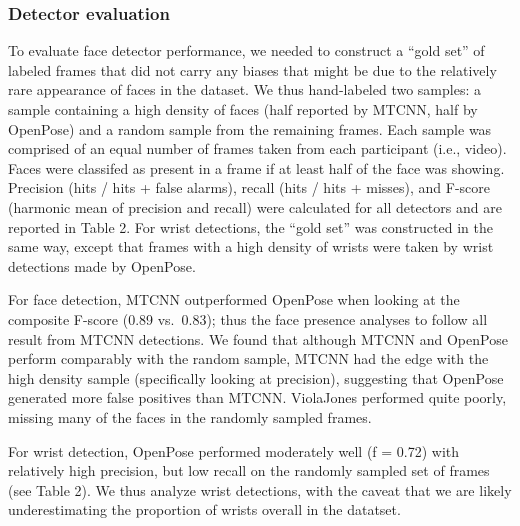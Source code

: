 \documentclass[10pt, letterpaper]{article}
\begin{document}
\subsubsection{Detector evaluation}\label{detector-evaluation}

To evaluate face detector performance, we needed to construct a ``gold
set'' of labeled frames that did not carry any biases that might be due
to the relatively rare appearance of faces in the dataset. We thus
hand-labeled two samples: a sample containing a high density of faces
(half reported by MTCNN, half by OpenPose) and a random sample from the
remaining frames. Each sample was comprised of an equal number of frames
taken from each participant (i.e., video). Faces were classifed as
present in a frame if at least half of the face was showing. Precision
(hits / hits + false alarms), recall (hits / hits + misses), and F-score
(harmonic mean of precision and recall) were calculated for all
detectors and are reported in Table 2. For wrist detections, the ``gold
set'' was constructed in the same way, except that frames with a high
density of wrists were taken by wrist detections made by OpenPose.

For face detection, MTCNN outperformed OpenPose when looking at the
composite F-score (0.89 vs.~0.83); thus the face presence analyses to
follow all result from MTCNN detections. We found that although MTCNN
and OpenPose perform comparably with the random sample, MTCNN had the
edge with the high density sample (specifically looking at precision),
suggesting that OpenPose generated more false positives than MTCNN.
ViolaJones performed quite poorly, missing many of the faces in the
randomly sampled frames.

For wrist detection, OpenPose performed moderately well (f = 0.72) with
relatively high precision, but low recall on the randomly sampled set of
frames (see Table 2). We thus analyze wrist detections, with the caveat
that we are likely underestimating the proportion of wrists overall in
the datatset.
\end{document}
